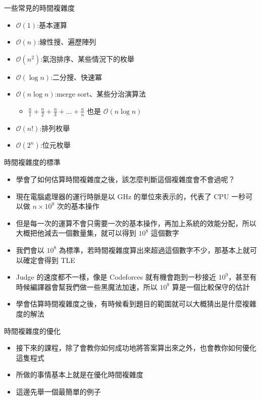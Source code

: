 \documentclass[aspectratio=169]{beamer}
\begin{document}
	\begin{frame}{一些常見的時間複雜度}
		\begin{itemize}
			\item $\mathcal{O}(1)$:基本運算
			\item $\mathcal{O}(n)$:線性搜、遍歷陣列
			\item $\mathcal{O}(n^2)$:氣泡排序、某些情況下的枚舉
			\item $\mathcal{O}(\log n)$:二分搜、快速冪
			\item $\mathcal{O}(n\log n)$:merge sort、某些分治演算法
				\begin{itemize}
					\item $\frac{n}{1}+\frac{n}{2}+\frac{n}{3}+...+\frac{n}{n}$ 也是 $\mathcal{O}(n \log n)$
				\end{itemize}
			\item $\mathcal{O}(n!)$:排列枚舉
			\item $\mathcal{O}(2^n)$:位元枚舉
		\end{itemize}
	\end{frame}

	\begin{frame}{時間複雜度的標準}
		\begin{itemize}
			\item<1-> 學會了如何估算時間複雜度之後，該怎麼判斷這個複雜度會不會過呢？
			\item<2-> 現在電腦處理器的運行時脈是以 GHz 的單位來表示的，代表了 CPU 一秒可以做 $n \times 10^9$ 次的基本操作
			\item<3-> 但是每一次的運算不會只需要一次的基本操作，再加上系統的效能分配，所以大概把他減去一個數量集，就可以得到 $10^8$ 這個數字
			\item<4-> 我們會以 $10^8$ 為標準，若時間複雜度算出來超過這個數字不少，那基本上就可以確定會得到 TLE
			\item<5-> Judge 的速度都不一樣，像是 Codeforces 就有機會跑到一秒接近 $10^9$，甚至有時候編譯器會幫我們做一些黑魔法加速，所以 $10^8$ 算是一個比較保守的估計
			\item<6-> 學會估算時間複雜度之後，有時候看到題目的範圍就可以大概猜出是什麼複雜度的解法
		\end{itemize}
	\end{frame}

	\begin{frame}{時間複雜度的優化}
		\begin{itemize}
			\item<1-> 接下來的課程，除了會教你如何成功地將答案算出來之外，也會教你如何優化這隻程式
			\item<2-> 所做的事情基本上就是在優化時間複雜度
			\item<3-> 這邊先舉一個最簡單的例子
		\end{itemize}
	\end{frame}
\end{document}
